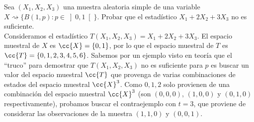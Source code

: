 \begin{ejercicio}
    Sea $(X_1, X_2, X_3)$ una muestra aleatoria simple de una variable $X\rightsquigarrow\{B(1,p) : p \in \left]0,1\right[\}$. Probar que el estadístico $X_1 + 2X_2 + 3X_3$ no es suficiente.\\

    \noindent
    Consideramos el estadístico $T(X_1, X_2, X_3) = X_1 + 2X_2 + 3X_3$. El espacio muestral de $X$ es $\cc{X}=\{0,1\}$, por lo que el espacio muestral de $T$ es $\cc{T} = \{0, 1, 2, 3, 4, 5, 6\}$. Sabemos por un ejemplo visto en teoría que el ``truco'' para demostrar que $T(X_1, X_2,X_3)$ no es suficiente para $p$ es buscar un valor del espacio muestral $\cc{T}$ que provenga de varias combinaciones de estados del espacio muestral $\cc{X}^3$. Como $0,1,2$ solo provienen de una combinación del espacio muestral $\cc{X}^3$ (son $(0,0,0)$, $(1,0,0)$ y $(0,1,0)$ respectivamente), probamos buscar el contraejemplo con $t=3$, que proviene de considerar las observaciones de la muestra $(1,1,0)$ y $(0,0,1)$.


\end{ejercicio}
